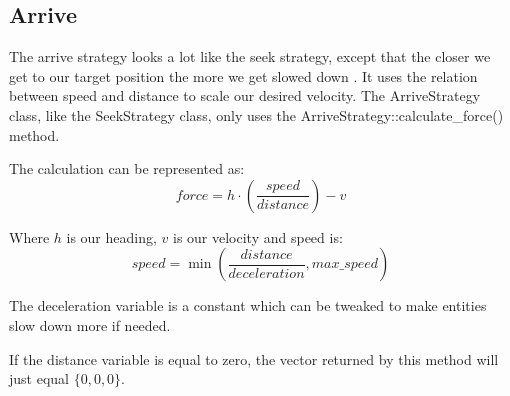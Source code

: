 \subsection{Arrive}
The arrive strategy looks a lot like the seek strategy, except that the 
closer we get to our target position the more we get slowed down
\cite[pg. 93]{buckland}. It uses the relation between speed and distance to 
scale our desired velocity. The ArriveStrategy class, like the SeekStrategy 
class, only uses the ArriveStrategy::calculate\_force() method.

The calculation can be represented as:
\large
$$ force = h \cdot (\frac{speed}{distance}) - v $$
\normalsize

Where $ h $ is our heading, $ v $ is our velocity and speed is:
\large
$$ speed = \min (\frac{distance}{deceleration}, max\_speed) $$
\normalsize

The deceleration variable is a constant which can be tweaked to make entities 
slow down more if needed.

If the distance variable is equal to zero, the vector returned by this method 
will just equal $ \{0, 0, 0\} $.

